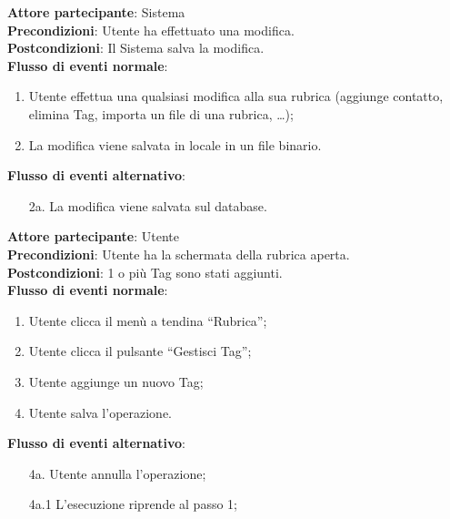 \begin{tcolorbox}[colback=white,colframe=black!80!white,title=\textbf{C7 - Salvare rubrica}]
	\textbf{Attore partecipante}: Sistema
	\\\textbf{Precondizioni}: Utente ha effettuato una modifica. 
	\\\textbf{Postcondizioni}: Il Sistema salva la modifica.
	\\\textbf{Flusso di eventi normale}:
	\begin{enumerate}[noitemsep, topsep=0pt]
		\item Utente effettua una qualsiasi modifica alla sua rubrica (aggiunge contatto, elimina Tag, importa un file di una rubrica, …); 
		\item La modifica viene salvata in locale in un file binario.
	\end{enumerate}
	\textbf{Flusso di eventi alternativo}:
	\begin{itemize}[noitemsep, topsep=0pt]
		\item[2a.] La modifica viene salvata sul database.
	\end{itemize}
\end{tcolorbox}

\begin{tcolorbox}[colback=white,colframe=black!80!white,title=\textbf{C8 - Aggiungere Tag}]
	\textbf{Attore partecipante}: Utente
	\\\textbf{Precondizioni}: Utente ha la schermata della rubrica aperta.
	\\\textbf{Postcondizioni}: 1 o più Tag sono stati aggiunti.
	\\\textbf{Flusso di eventi normale}:
	\begin{enumerate}[noitemsep, topsep=0pt]
		\item Utente clicca il menù a tendina “Rubrica”;
	\item	Utente clicca il pulsante “Gestisci Tag”;
	\item	Utente aggiunge un nuovo Tag;
	\item	Utente salva l’operazione.		
	\end{enumerate}
	\textbf{Flusso di eventi alternativo}:
	\begin{itemize}[noitemsep, topsep=0pt]
		\item[4a. ] Utente annulla l’operazione;
		\item[4a.1] L’esecuzione riprende al passo 1;		
	\end{itemize}
\end{tcolorbox}

